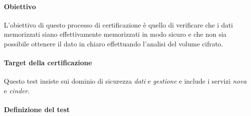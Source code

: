 \documentclass[../main.tex]{subfiles}
\begin{document}
\paragraph{Obiettivo}
L'obiettivo di questo processo di certificazione è quello di verificare che i dati memorizzati siano effettivamente memorizzati in modo sicuro e che non sia possibile ottenere il dato in chiaro effettuando l'analisi del volume cifrato.

\paragraph{Target della certificazione}
Questo test insiste sui dominio di sicurezza \textit{dati} e \textit{gestione} e include i servizi \textit{nova} e \textit{cinder}.
\paragraph{Definizione del test}
\end{document}
